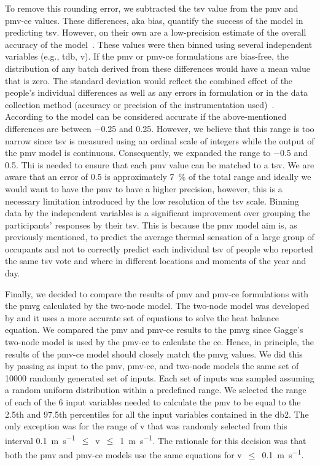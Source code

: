 To remove this rounding error, we subtracted the \ac{tsv} value from the \ac{pmv} and \ac{pmv-ce} values.
These differences, aka bias, quantify the success of the model in predicting \ac{tsv}.
However, on their own are a low-precision estimate of the overall accuracy of the model~\cite{Humphreys2002}.
These values were then binned using several independent variables (e.g., \ac{tdb}, \ac{v}).
If the \ac{pmv} or \ac{pmv-ce} formulations are bias-free, the distribution of any batch derived from these differences would have a mean value that is zero.
The standard deviation would reflect the combined effect of the people's individual differences as well as any errors in formulation or in the data collection method (accuracy or precision of the instrumentation used)~\cite{Humphreys2002}.
According to  the model can be considered accurate if the above-mentioned differences are between \num{-0.25} and \num{0.25}.
However, we believe that this range is too narrow since \ac{tsv} is measured using an ordinal scale of integers while the output of the \ac{pmv} model is continuous.
Consequently, we expanded the range to \num{-.5} and \num{0.5}.
Thi is needed to ensure that each \ac{pmv} value can be matched to a \ac{tsv}.
We are aware that an error of \num{.5} is approximately \qty{7}{\percent} of the total range and ideally we would want to have the \ac{pmv} to have a higher precision, however, this is a necessary limitation introduced by the low resolution of the \ac{tsv} scale.
Binning data by the independent variables is a significant improvement over grouping the participants' responses by their \ac{tsv}.
This is because the \ac{pmv} model aim is, as previously mentioned, to predict the average thermal sensation of a large group of occupants and not to correctly predict each individual \ac{tsv} of people who reported the same \ac{tsv} vote and where in different locations and moments of the year and day.

Finally, we decided to compare the results of \ac{pmv} and \ac{pmv-ce} formulations with the \ac{pmvg} calculated by the two-node model.
The two-node model was developed by  and it uses a more accurate set of equations to solve the heat balance equation.
We compared the \ac{pmv} and \ac{pmv-ce} results to the \ac{pmvg} since Gagge's two-node model is used by the \ac{pmv-ce} to calculate the \ac{ce}.
Hence, in principle, the results of the \ac{pmv-ce} model should closely match the \ac{pmvg} values.
We did this by passing as input to the \ac{pmv}, \ac{pmv-ce}, and two-node models the same set of \num{10000} randomly generated set of inputs. 
Each set of inputs was sampled assuming a random uniform distribution within a predefined range. 
We selected the range of each of the 6 input variables needed to calculate the \ac{pmv} to be equal to the 2.5th and 97.5th percentiles for all the input variables contained in the \ac{db2}.
The only exception was for the range of \ac{v} that was randomly selected from this interval \qty{0.1}{\m\per\s}~$\leq$~\ac{v}~$\leq$~\qty{1}{\m\per\s}.
The rationale for this decision was that both the \ac{pmv} and \ac{pmv-ce} models use the same equations for \ac{v}~$\leq$~\qty{0.1}{\m\per\s}.

